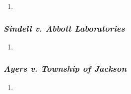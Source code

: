 \begin{enumerate}
    \item
\end{enumerate}

\subsubsection{\emph{Sindell v. Abbott Laboratories}}

\begin{enumerate}
    \item
\end{enumerate}

\subsubsection{\emph{Ayers v. Township of Jackson}}

\begin{enumerate}
    \item
\end{enumerate}
